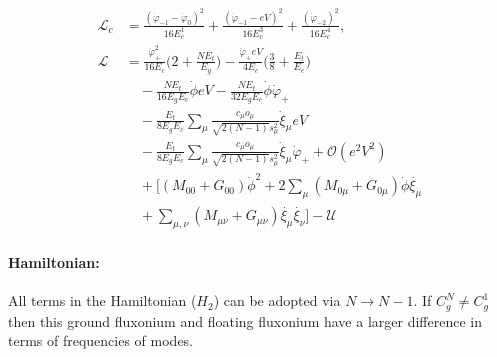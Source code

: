 \documentclass[%
reprint,
superscriptaddress,
 amsmath,amssymb,
 aps,
 prx,
longbibliography,
floatfix,
]{revtex4-2}
\begin{document}
\begin{align}
    \mathcal{L}_{c}&=\frac{(\dot{\varphi}_{-1}-\dot{\varphi}_{0})^2}{16E^1_{c}}+\frac{(\dot{\varphi}_{-1}-eV)^2}{16E^3_{c}}+\frac{(\dot{\varphi}_{-2})^2}{16E^4_{c}},\\
 \mathcal{L}&=\frac{\dot{\varphi}_{+}^2}{16E_c}\Big(2+\frac{NE_t}{E_g}\Big)-\frac{\dot{\varphi}_{+}eV}{4E_c}\Big(\frac{3}{8}+\frac{E_t}{E_c}\Big)\nonumber\\
    &\quad-\frac{NE_t}{16E_gE_c}\dot{\phi}eV-\frac{NE_t}{32E_gE_c}\dot{\phi}\dot{\varphi}_{+}\\
    &\quad -\frac{E_t}{8E_gE_c} \sum_\mu\frac{c_\mu o_\mu}{\sqrt{2(N-1)}s_\mu^2}  \dot{\xi}_\mu eV\nonumber\\
    &\quad-\frac{E_t}{8E_gE_c} \sum_\mu\frac{c_\mu o_\mu}{\sqrt{2(N-1)}s_\mu^2}  \dot{\xi}_\mu\dot{\varphi}_{+}+\mathcal{O}(e^2V^2)\\
    &\quad+\Big[(M_{00}+G_{00})\dot{\phi}^2+2\sum_{\mu}(M_{0\mu}+G_{0\mu})\dot{\phi}\dot{\xi_\mu}\nonumber\\
    &\quad+\sum_{\mu,\nu}(M_{\mu\nu}+G_{\mu\nu})\dot{\xi_\mu}\dot{\xi_\nu}\Big]-\mathcal{U}
\end{align}

\paragraph{Hamiltonian:} All terms in the Hamiltonian ($H_2$) can be adopted via $N\rightarrow N-1$. If $C_g^N\neq C_g^1$ then this ground fluxonium and floating fluxonium have a larger difference in terms of frequencies of modes.
 
\end{document}
